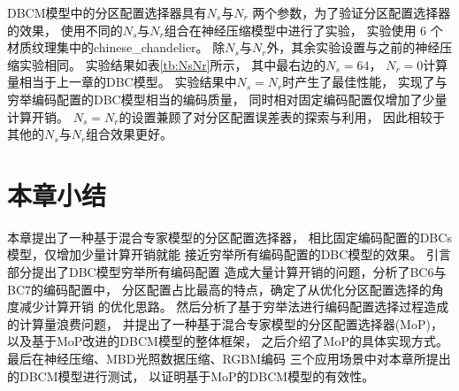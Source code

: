 DBCM模型中的分区配置选择器具有$N_s$与$N_r$
两个参数，为了验证分区配置选择器的效果，
使用不同的$N_s$与$N_r$组合在神经压缩模型中进行了实验，
实验使用 6 个材质纹理集中的chinese\_chandelier。
除$N_s$与$N_r$外，其余实验设置与之前的神经压缩实验相同。
实验结果如表\ref{tb:NsNr}所示，
其中最右边的$N_s=64$， $N_r=0$计算量相当于上一章的DBC模型。
实验结果中$N_s=N_r$时产生了最佳性能，
实现了与穷举编码配置的DBC模型相当的编码质量，
同时相对固定编码配置仅增加了少量计算开销。
$N_s=N_r$的设置兼顾了对分区配置误差表的探索与利用，
因此相较于其他的$N_s$与$N_r$组合效果更好。
\begin{table*}[htbp]
    \centering
    \caption{ $N_s$与$N_r$的参数敏感性实验}
    \label{tb:NsNr}
\end{table*}

\section{本章小结}

本章提出了一种基于混合专家模型的分区配置选择器，
相比固定编码配置的DBCs模型，仅增加少量计算开销就能
接近穷举所有编码配置的DBC模型的效果。
引言部分提出了DBC模型穷举所有编码配置
造成大量计算开销的问题，分析了BC6与BC7的编码配置中，
分区配置占比最高的特点，确定了从优化分区配置选择的角度减少计算开销
的优化思路。
然后分析了基于穷举法进行编码配置选择过程造成的计算量浪费问题，
并提出了一种基于混合专家模型的分区配置选择器(MoP)，
以及基于MoP改进的DBCM模型的整体框架，
之后介绍了MoP的具体实现方式。
最后在神经压缩、MBD光照数据压缩、RGBM编码
三个应用场景中对本章所提出的DBCM模型进行测试，
以证明基于MoP的DBCM模型的有效性。